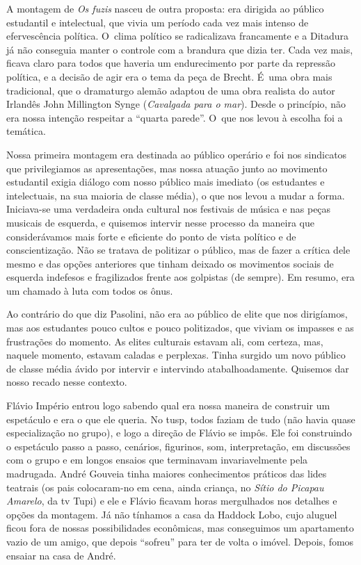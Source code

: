 {\subject{Montagem de Os fuzis de Tereza Carrar}

A montagem de {\it Os fuzis} nasceu de outra proposta: era dirigida ao
público estudantil e intelectual, que vivia um período cada vez mais
intenso de efervescência política. O~clima político se radicalizava
francamente e a Ditadura já não conseguia manter o controle com a
brandura que dizia ter. Cada vez mais, ficava claro para todos que
haveria um endurecimento por parte da repressão política, e a decisão de
agir era o tema da peça de Brecht. É~uma obra mais tradicional, que
o dramaturgo alemão adaptou de uma obra realista do autor Irlandês John
Millington Synge ({\it Cavalgada para o mar}). Desde o princípio, não
era nossa intenção respeitar a “quarta parede”. O~que nos levou à
escolha foi a temática.

Nossa primeira montagem era destinada ao público operário e foi nos
sindicatos que privilegiamos as apresentações, mas nossa atuação junto ao
movimento estudantil exigia diálogo com nosso público mais
imediato (os estudantes e intelectuais, na sua maioria de classe média),
o que nos levou a mudar a forma. Iniciava-se
uma verdadeira onda cultural nos festivais de música e nas peças musicais
de esquerda, e quisemos intervir nesse processo da maneira que
considerávamos mais forte e eficiente do ponto de vista político e de
conscientização. Não se tratava de politizar o público, mas de fazer a
crítica dele mesmo e das opções anteriores que tinham deixado os
movimentos sociais de esquerda indefesos e fragilizados frente aos
golpistas (de sempre). Em resumo, era um chamado à luta com todos os
ônus.

Ao contrário do que diz Pasolini, não era ao público de elite que nos
dirigíamos, mas aos estudantes pouco cultos e pouco politizados, que
viviam os impasses e as frustrações do momento. As elites culturais
estavam ali, com certeza, mas, naquele momento, estavam caladas e perplexas.
Tinha surgido um novo público de classe média ávido por intervir e
intervindo atabalhoadamente. Quisemos dar nosso recado nesse contexto.

Flávio Império entrou logo sabendo qual era nossa maneira de construir
um espetáculo e era o que ele queria. No {\sc tusp}, todos faziam de tudo (não
havia quase especialização no grupo), e logo a direção de Flávio se
impôs. Ele foi construindo o espetáculo passo a passo, cenários, figurinos, som, interpretação, em discussões com o grupo e em longos ensaios que
terminavam invariavelmente pela madrugada. André Gouveia tinha maiores
conhecimentos práticos das lides teatrais (os pais colocaram-no em cena, ainda criança, no {\it Sítio do Picapau Amarelo}, da {\sc tv} Tupi) e ele e
Flávio ficavam horas mergulhados nos detalhes e opções da montagem. Já
não tínhamos a casa da Haddock Lobo, cujo aluguel ficou fora de nossas
possibilidades econômicas, mas conseguimos um apartamento vazio de um
amigo, que depois “sofreu” para ter de volta o imóvel. Depois, fomos
ensaiar na casa de André.

}
